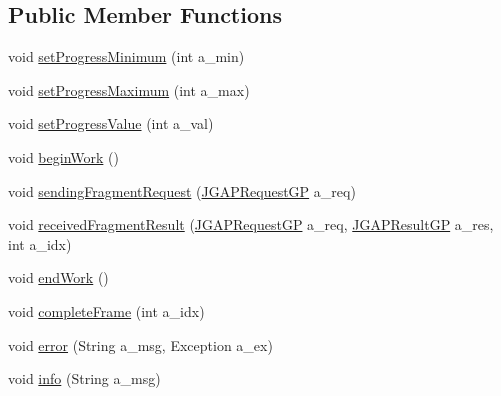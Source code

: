 \subsection*{Public Member Functions}
\begin{DoxyCompactItemize}
\item 
void \hyperlink{classorg_1_1jgap_1_1distr_1_1grid_1_1gp_1_1_null_client_feedback_g_p_af9b426613aeb9d709a7ba302e385b87f}{set\-Progress\-Minimum} (int a\-\_\-min)
\item 
void \hyperlink{classorg_1_1jgap_1_1distr_1_1grid_1_1gp_1_1_null_client_feedback_g_p_a49b78d7a4883fc70f15172d8f32f2510}{set\-Progress\-Maximum} (int a\-\_\-max)
\item 
void \hyperlink{classorg_1_1jgap_1_1distr_1_1grid_1_1gp_1_1_null_client_feedback_g_p_a163503f22d4761fbfeb9a6da5a9ee1bd}{set\-Progress\-Value} (int a\-\_\-val)
\item 
void \hyperlink{classorg_1_1jgap_1_1distr_1_1grid_1_1gp_1_1_null_client_feedback_g_p_ac1f68d4ede5aa1762d213365afe93225}{begin\-Work} ()
\item 
void \hyperlink{classorg_1_1jgap_1_1distr_1_1grid_1_1gp_1_1_null_client_feedback_g_p_a263a9564ed6d8dac3af3bb0d4f2e6f3a}{sending\-Fragment\-Request} (\hyperlink{classorg_1_1jgap_1_1distr_1_1grid_1_1gp_1_1_j_g_a_p_request_g_p}{J\-G\-A\-P\-Request\-G\-P} a\-\_\-req)
\item 
void \hyperlink{classorg_1_1jgap_1_1distr_1_1grid_1_1gp_1_1_null_client_feedback_g_p_a6b601fbcab289277e508d0b13dad1de5}{received\-Fragment\-Result} (\hyperlink{classorg_1_1jgap_1_1distr_1_1grid_1_1gp_1_1_j_g_a_p_request_g_p}{J\-G\-A\-P\-Request\-G\-P} a\-\_\-req, \hyperlink{classorg_1_1jgap_1_1distr_1_1grid_1_1gp_1_1_j_g_a_p_result_g_p}{J\-G\-A\-P\-Result\-G\-P} a\-\_\-res, int a\-\_\-idx)
\item 
void \hyperlink{classorg_1_1jgap_1_1distr_1_1grid_1_1gp_1_1_null_client_feedback_g_p_aa63985ffde0f0578619c6c03732ccc64}{end\-Work} ()
\item 
void \hyperlink{classorg_1_1jgap_1_1distr_1_1grid_1_1gp_1_1_null_client_feedback_g_p_af3df33fcbadcab9aa6fd4a2148baad25}{complete\-Frame} (int a\-\_\-idx)
\item 
void \hyperlink{classorg_1_1jgap_1_1distr_1_1grid_1_1gp_1_1_null_client_feedback_g_p_a78e12e0649e8a6c76820facf2eefba54}{error} (String a\-\_\-msg, Exception a\-\_\-ex)
\item 
void \hyperlink{classorg_1_1jgap_1_1distr_1_1grid_1_1gp_1_1_null_client_feedback_g_p_a989704058707fceb24285ee9b1f30f70}{info} (String a\-\_\-msg)
\end{DoxyCompactItemize}
